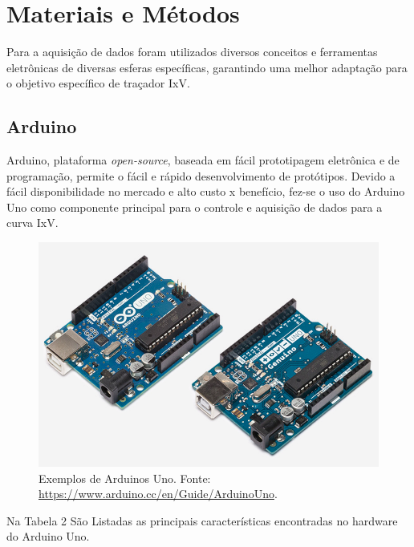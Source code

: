 \chapter{Materiais e Métodos}
\label{cap:03}
Para a aquisição de dados foram utilizados diversos conceitos e ferramentas eletrônicas de diversas esferas específicas, garantindo uma melhor adaptação para o objetivo específico de traçador IxV.%

\section{Arduino}
Arduino, plataforma \textit{open-source}, baseada em fácil prototipagem eletrônica e de programação, permite o fácil e rápido desenvolvimento de protótipos. Devido a fácil disponibilidade no mercado e alto custo x benefício, fez-se o uso do Arduino Uno como componente principal para o controle e aquisição de dados para a curva IxV.

\FloatBarrier
\begin{figure}[!htbp]
	\centering
	\includegraphics[scale=0.7]{imagens/Uno}
	\caption{Exemplos de Arduinos Uno. Fonte:  \url{https://www.arduino.cc/en/Guide/ArduinoUno}. }
	
	\label{fig:ArduinoUno}
\end{figure}
\FloatBarrier

Na Tabela 2 São Listadas as principais características encontradas no hardware do Arduino Uno.

